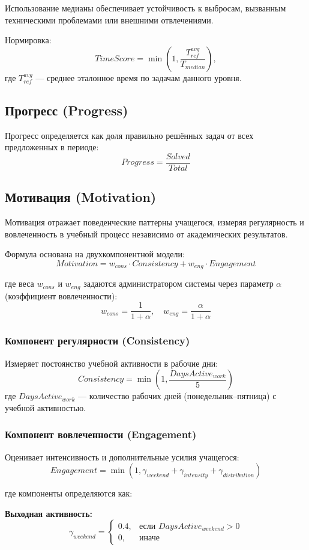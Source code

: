 \documentclass[12pt,a4paper]{article}
\begin{document}
Использование медианы обеспечивает устойчивость к выбросам, вызванным техническими проблемами или внешними отвлечениями.

Нормировка:
\[
TimeScore = \min\left(1, \frac{T_{ref}^{avg}}{T_{median}}\right),
\]
где $T_{ref}^{avg}$ — среднее эталонное время по задачам данного уровня.

\subsection{Прогресс (Progress)}
Прогресс определяется как доля правильно решённых задач от всех предложенных в периоде:
\[
Progress = \frac{Solved}{Total}
\]

\subsection{Мотивация (Motivation)}
Мотивация отражает поведенческие паттерны учащегося, измеряя регулярность и вовлеченность в учебный процесс независимо от академических результатов.

Формула основана на двухкомпонентной модели:
\[
Motivation = w_{cons} \cdot Consistency + w_{eng} \cdot Engagement
\]

где веса $w_{cons}$ и $w_{eng}$ задаются администратором системы через параметр $\alpha$ (коэффициент вовлеченности):
\[
w_{cons} = \frac{1}{1 + \alpha}, \quad w_{eng} = \frac{\alpha}{1 + \alpha}
\]

\subsubsection{Компонент регулярности (Consistency)}
Измеряет постоянство учебной активности в рабочие дни:
\[
Consistency = \min\left(1, \frac{DaysActive_{work}}{5}\right)
\]
где $DaysActive_{work}$ — количество рабочих дней (понедельник–пятница) с учебной активностью.

\subsubsection{Компонент вовлеченности (Engagement)} 
Оценивает интенсивность и дополнительные усилия учащегося:
\[
Engagement = \min\left(1, \gamma_{weekend} + \gamma_{intensity} + \gamma_{distribution}\right)
\]

где компоненты определяются как:

\textbf{Выходная активность:}
\[
\gamma_{weekend} = \begin{cases}
0.4, & \text{если } DaysActive_{weekend} > 0 \\
0, & \text{иначе}
\end{cases}
\]
\end{document}
